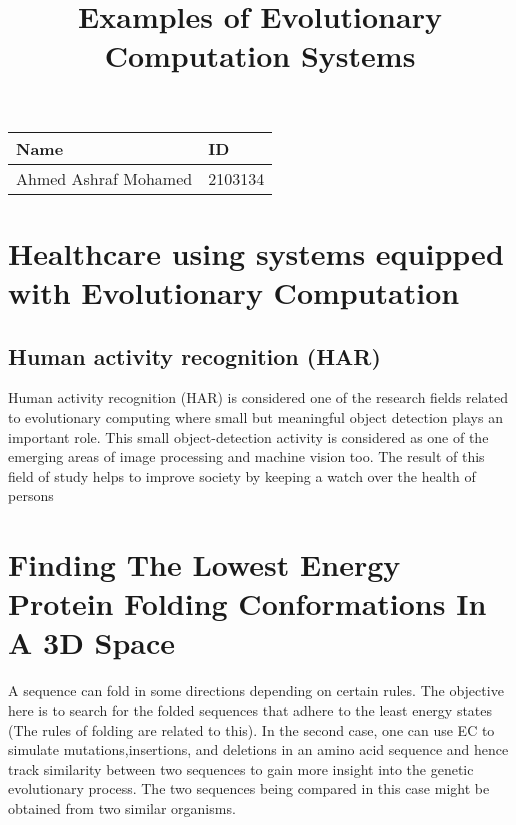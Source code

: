 \documentclass{article}
\title{Examples of Evolutionary Computation Systems}
\author{}
\date{}
\begin{document}
\maketitle
\begin{center}
    {\large
        \begin{tabular}{l l}
            \toprule
            \textbf{Name}        & \textbf{ID} \\
            \midrule
            Ahmed Ashraf Mohamed & 2103134     \\
            \bottomrule
        \end{tabular}
    }
\end{center}
\section{Healthcare using systems equipped with Evolutionary Computation }
\subsection*{Human activity recognition (HAR)}

Human activity recognition (HAR) is considered one of the research fields related to
evolutionary computing where small but meaningful object detection plays an important role. This small object-detection activity is considered as one of the emerging
areas of image processing and machine vision too. The result of this field of study
helps to improve society by keeping a watch over the health of persons

\section{Finding The Lowest Energy Protein Folding Conformations In A 3D Space}

A sequence can fold in some directions depending on certain rules.
The objective here is to search for the folded sequences that adhere to the least energy states (The rules of folding are related to this).
In the second case, one can use EC to simulate mutations,insertions, and deletions in an amino acid sequence and hence track similarity between two sequences to gain more insight into the genetic evolutionary process.
The two sequences being compared in this case might be obtained from two similar organisms.
\end{document}
